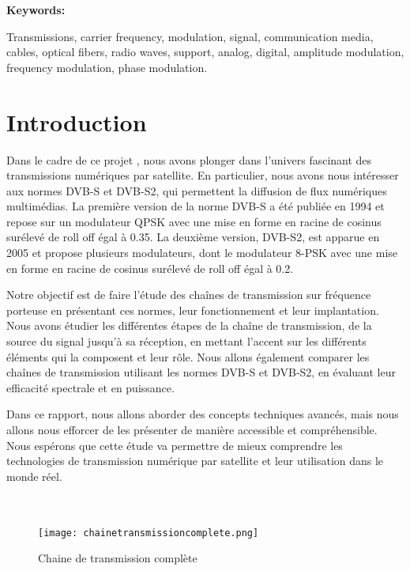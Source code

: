\documentclass[11pt]{article}
\begin{document}
{\bfseries Keywords:}

Transmissions, carrier frequency, modulation, signal, communication media, cables, optical fibers, radio waves, support, analog, digital, amplitude modulation, frequency modulation, phase modulation.

\newpage
\tableofcontents
\listoffigures

\newpage
\section{Introduction}

Dans le cadre de ce projet , nous avons plonger dans l'univers fascinant des transmissions numériques par satellite. En particulier, nous avons nous intéresser aux normes DVB-S et DVB-S2, qui permettent la diffusion de flux numériques multimédias. La première version de la norme DVB-S a été publiée en 1994 et repose sur un modulateur QPSK avec une mise en forme en racine de cosinus surélevé de roll off égal à 0.35. La deuxième version, DVB-S2, est apparue en 2005 et propose plusieurs modulateurs, dont le modulateur 8-PSK avec une mise en forme en racine de cosinus surélevé de roll off égal à 0.2.

Notre objectif est de faire l'étude des chaînes de transmission sur fréquence porteuse en présentant ces normes, leur fonctionnement et leur implantation. Nous avons étudier les différentes étapes de la chaîne de transmission, de la source du signal jusqu'à sa réception, en mettant l'accent sur les différents éléments qui la composent et leur rôle. Nous allons également comparer les chaînes de transmission utilisant les normes DVB-S et DVB-S2, en évaluant leur efficacité spectrale et en puissance.

Dans ce rapport, nous allons aborder des concepts techniques avancés, mais nous allons nous efforcer de les présenter de manière accessible et compréhensible. Nous espérons que cette étude va permettre de mieux comprendre les technologies de transmission numérique par satellite et leur utilisation dans le monde réel.\\\\\\

\begin{figure}[ht!]
    \centering
    \texttt{[image: chainetransmissioncomplete.png]}
    \caption{Chaine de transmission complète \label{fig : chainetransmissioncomplete}}
\end{figure}
\end{document}
